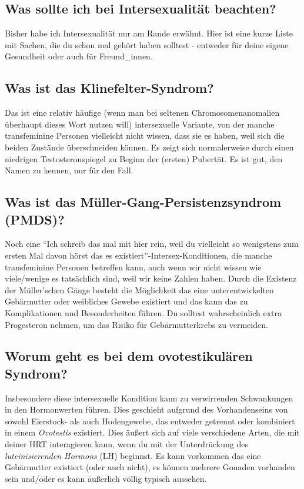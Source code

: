 \documentclass{article}
\begin{document}
\subsection{Was sollte ich bei Intersexualität beachten?}

Bisher habe ich Intersexualität nur am Rande erwähnt. Hier ist eine kurze Liste mit Sachen, die du schon mal gehört haben solltest - entweder für deine eigene Gesundheit oder auch für Freund\_innen.

\subsection{Was ist das Klinefelter-Syndrom?}

Das ist eine relativ häufige (wenn man bei seltenen Chromosomenanomalien überhaupt dieses Wort nutzen will) intersexuelle Variante, von der manche transfeminine Personen vielleicht nicht wissen, dass sie es haben, weil sich die beiden Zustände überschneiden können. Es zeigt sich normalerweise durch einen niedrigen Testosteronspiegel zu Beginn der (ersten) Pubertät. Es ist gut, den Namen zu kennen, nur für den Fall.

\subsection{Was ist das Müller-Gang-Persistenzsyndrom (PMDS)?}

Noch eine “Ich schreib das mal mit hier rein, weil du vielleicht so wenigstens zum ersten Mal davon hörst das es existiert”-Intersex-Konditionen, die manche transfeminine Personen betreffen kann, auch wenn wir nicht wissen wie viele/wenige es tatsächlich sind, weil wir keine Zahlen haben. Durch die Existenz der Müller'schen Gänge besteht die Möglichkeit das eine unterentwickelten Gebärmutter oder weibliches Gewebe existiert und das kann das zu Komplikationen und Besonderheiten führen. Du solltest wahrscheinlich extra Progesteron nehmen, um das Risiko für Gebärmutterkrebs zu vermeiden.

\subsection{Worum geht es bei dem ovotestikulären Syndrom?}

Insbesondere diese intersexuelle Kondition kann zu verwirrenden Schwankungen in den Hormonwerten führen. Dies geschieht aufgrund des Vorhandenseins von sowohl Eierstock- als auch Hodengewebe, das entweder getrennt oder kombiniert in einem \textit{Ovotestis} existiert. Dies äußert sich auf viele verschiedene Arten, die mit deiner HRT interagieren kann, wenn du mit der Unterdrückung des \textit{luteinisierenden Hormons} (LH) beginnst. Es kann vorkommen das eine Gebärmutter existiert (oder auch nicht), es können mehrere Gonaden vorhanden sein und/oder es kann äußerlich völlig typisch aussehen.
\end{document}
